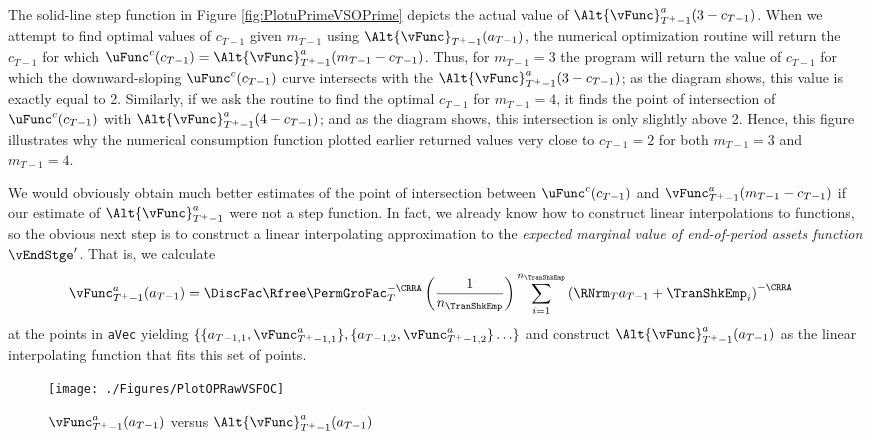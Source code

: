 \documentclass[titlepage, headings=optiontotocandhead]{\econtex}
\begin{document}
The solid-line step function in Figure \ref{fig:PlotuPrimeVSOPrime}
depicts the actual value of
$\Alt{\vFunc}_{T^{+}-1}^{{a}}(3-{c}_{T-1})$.  When we attempt to find
optimal values of ${c}_{T-1}$ given ${m}_{T-1}$ using
$\Alt{\vFunc}_{T^{+}-1}({a}_{T-1})$, the numerical optimization
routine will return the ${c}_{T-1}$ for which $\uFunc^{{c}}({c}_{T-1}) =
\Alt{\vFunc}^{{a}}_{T^{+}-1}({m}_{T-1}-{c}_{T-1})$.  Thus, for
${m}_{T-1}=3$ the program will return the value of ${c}_{T-1}$ for
which the downward-sloping $\uFunc^{{c}}({c}_{T-1})$ curve intersects with the
$\Alt{\vFunc}_{T^{+}-1}^{{a}}(3-{c}_{T-1})$; as the diagram shows,
this value is exactly equal to 2.  Similarly, if we ask the routine
to find the optimal ${c}_{T-1}$ for ${m}_{T-1}=4$, it finds the point
of intersection of $\uFunc^{{c}}({c}_{T-1})$ with
$\Alt{\vFunc}_{T^{+}-1}^{{a}}(4-{c}_{T-1})$; and as the diagram shows,
this intersection is only slightly above 2.  Hence, this figure
illustrates why the numerical consumption function plotted earlier
returned values very close to ${c}_{T-1}=2$ for both ${m}_{T-1}=3$ and
${m}_{T-1}=4$. 

We would obviously obtain much better estimates of the point of
intersection between $\uFunc^{{c}}({c}_{T-1})$ and
$\vFunc_{T^{+}-1}^{{a}}({m}_{T-1}-{c}_{T-1})$ if our estimate of
$\Alt{\vFunc}^{{a}}_{T^{+}-1}$ were not a step function.  In
fact, we already know how to construct linear interpolations
to functions, so the obvious next step is to construct a
linear interpolating approximation to the \textit{expected marginal
  value of end-of-period assets function} $\vEndStge^{\prime}$. That is, we calculate
\begin{equation}\begin{gathered}\begin{aligned}
      \vFunc_{T^{+}-1}^{{a}}({a}_{T-1})  & =  \DiscFac \Rfree \PermGroFac_{T}^{-\CRRA} \left(\frac{1}{n_{\TranShkEmp}}\right) \sum_{i=1}^{n_{\TranShkEmp}} \left(\RNrm_{T} {a}_{T-1} + \TranShkEmp_{i}\right)^{-\CRRA} \label{eq:vEndPrimeTm1}
    \end{aligned}\end{gathered}\end{equation}
at the points in \texttt{aVec} yielding
$\{\{\null{a}_{T-1,1},\vFunc_{T^{+}-1,1}^{{a}}\},\{{a}_{T-1,2},\vFunc_{T^{+}-1,2}^{{a}}\}
\ldots\}$ and construct
$\Alt{\vFunc}_{T^{+}-1}^{{a}}({a}_{T-1})$ as the linear
interpolating function that fits this set of points.

\hypertarget{PlotOPRawVSFOC}{}
\begin{figure}
  \centerline{\texttt{[image: ./Figures/PlotOPRawVSFOC]}}
  \caption{$\vFunc_{T^{+}-1}^{{a}}({a}_{T-1})$ versus $\Alt{\vFunc}_{T^{+}-1}^{{a}}({a}_{T-1})$}
  \label{fig:PlotOPRawVSFOC}
\end{figure}
\end{document}
